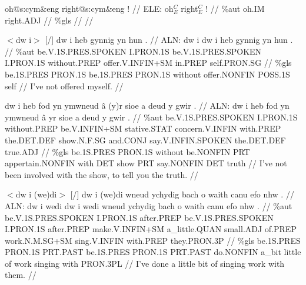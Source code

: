 \documentclass[a4paper,10pt]{article}
\begin{document}
\ex
\begingl[lingstyle=gergl]
\glchat oh@s:cym\&eng right@s:cym\&eng ! //
\glsurface ELE:  oh$^{C}_{E}$ right$^{C}_{E}$ !  //
\glauto \%aut  oh{\scriptsize .IM} right{\scriptsize .ADJ}   //
\glmanual \%gls      //
\gleng  //
\endgl
\xe

\ex
\begingl[lingstyle=gergl]
\glchat $<$dw i$>$ [/] dw i heb gynnig yn hun . //
\glsurface ALN:  dw i dw i heb gynnig yn hun .  //
\glauto \%aut  be{\scriptsize .V.1S.PRES.SPOKEN} I{\scriptsize .PRON.1S} be{\scriptsize .V.1S.PRES.SPOKEN} I{\scriptsize .PRON.1S} without{\scriptsize .PREP} offer{\scriptsize .V.INFIN+SM} in{\scriptsize .PREP} self{\scriptsize .PRON.SG}   //
\glmanual \%gls  be{\scriptsize .1S.PRES} PRON{\scriptsize .1S} be{\scriptsize .1S.PRES} PRON{\scriptsize .1S} without offer{\scriptsize .NONFIN} POSS{\scriptsize .1S} self   //
\gleng I've not offered myself. //
\endgl
\xe

\ex
\begingl[lingstyle=gergl]
\glchat dw i heb fod yn ymwneud â (y)r sioe a deud y gwir . //
\glsurface ALN:  dw i heb fod yn ymwneud â yr sioe a deud y gwir .  //
\glauto \%aut  be{\scriptsize .V.1S.PRES.SPOKEN} I{\scriptsize .PRON.1S} without{\scriptsize .PREP} be{\scriptsize .V.INFIN+SM} stative{\scriptsize .STAT} concern{\scriptsize .V.INFIN} with{\scriptsize .PREP} the{\scriptsize .DET.DEF} show{\scriptsize .N.F.SG} and{\scriptsize .CONJ} say{\scriptsize .V.INFIN.SPOKEN} the{\scriptsize .DET.DEF} true{\scriptsize .ADJ}   //
\glmanual \%gls  be{\scriptsize .1S.PRES} PRON{\scriptsize .1S} without be{\scriptsize .NONFIN} PRT appertain{\scriptsize .NONFIN} with DET show PRT say{\scriptsize .NONFIN} DET truth   //
\gleng I've not been involved with the show, to tell you the truth. //
\endgl
\xe

\ex
\begingl[lingstyle=gergl]
\glchat $<$dw i (we)di$>$ [/] dw i (we)di wneud ychydig bach o waith canu efo nhw . //
\glsurface ALN:  dw i wedi dw i wedi wneud ychydig bach o waith canu efo nhw .  //
\glauto \%aut  be{\scriptsize .V.1S.PRES.SPOKEN} I{\scriptsize .PRON.1S} after{\scriptsize .PREP} be{\scriptsize .V.1S.PRES.SPOKEN} I{\scriptsize .PRON.1S} after{\scriptsize .PREP} make{\scriptsize .V.INFIN+SM} a\_little{\scriptsize .QUAN} small{\scriptsize .ADJ} of{\scriptsize .PREP} work{\scriptsize .N.M.SG+SM} sing{\scriptsize .V.INFIN} with{\scriptsize .PREP} they{\scriptsize .PRON.3P}   //
\glmanual \%gls  be{\scriptsize .1S.PRES} PRON{\scriptsize .1S} PRT{\scriptsize .PAST} be{\scriptsize .1S.PRES} PRON{\scriptsize .1S} PRT{\scriptsize .PAST} do{\scriptsize .NONFIN} a\_bit little of work singing with PRON{\scriptsize .3PL}   //
\gleng I've done a little bit of singing work with them. //
\endgl
\xe
\end{document}

